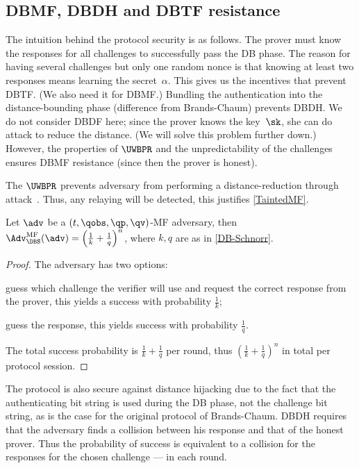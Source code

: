 \subsection{\acs*{DBMF}, \acs*{DBDH} and \acs*{DBTF} resistance}

The intuition behind the protocol security is as follows.
The prover must know the responses for all challenges to successfully pass the 
\ac{DB} phase.
The reason for having several challenges but only one random nonce is that 
knowing at least two responses means learning the secret~\(\alpha\).
This gives us the incentives that prevent \ac{DBTF}.
(We also need it for \ac{DBMF}.)
Bundling the authentication into the distance-bounding phase (difference from 
Brands-Chaum) prevents \ac{DBDH}.
We do not consider \ac{DBDF} here; since the prover knows the key~\(\sk\), she 
can do  attack to reduce the distance.
(We will solve this problem further down.)
However, the properties of \(\UWBPR\) and the unpredictability of the 
challenges ensures \ac{DBMF} resistance (since then the prover is honest).

The \(\UWBPR\) prevents  adversary from performing a 
distance-reduction through  attack~\cite{UWBPR}.
Thus, any relaying will be detected, \ie this justifies \cref{TaintedMF}.

\begin{theorem}
  Let \(\adv\) be a \((t, \qobs, \qp, \qv)\)-MF adversary, then 
  \(\Adv_{\DBS}^{\text{MF}}(\adv) = \left(\frac{1}{k}+\frac{1}{q}\right)^n\), 
  where \(k, q\) are as in \cref{DB-Schnorr}.
\end{theorem}

\begin{proof}
  The adversary has two options:
  \begin{enumerate*}
  \item guess which challenge the verifier will use and request the correct 
    response from the prover, this yields a success with probability 
    \(\frac{1}{k}\);
  \item guess the response, this yields success with probability 
    \(\frac{1}{q}\).
  \end{enumerate*}
  The total success probability is \(\frac{1}{k} + \frac{1}{q}\) per round, 
  thus \(\left(\frac{1}{k}+\frac{1}{q}\right)^n\) in total per protocol 
  session.
\end{proof}

The protocol is also secure against distance hijacking due to the fact that the 
authenticating bit string is used during the \ac{DB} phase, not the challenge 
bit string, as is the case for the original protocol of Brands-Chaum.
\Ac{DBDH} requires that the adversary finds a collision between his response 
and that of the honest prover.
Thus the probability of success is equivalent to a collision for the responses 
for the chosen challenge --- in each round.

